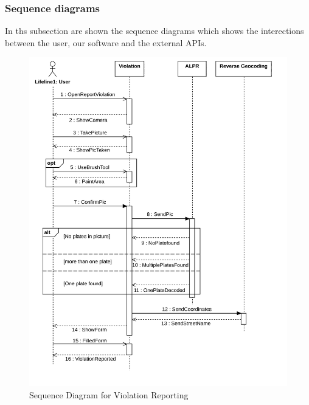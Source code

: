 

\subsubsection{Sequence diagrams}
In ths subsection are shown the sequence diagrams which shows the interections between the user, our software and the external APIs.

\begin{figure}[H]
   \centering
     \includegraphics[width=\textwidth]{Images/SequenceViolation.png}
     \caption{Sequence Diagram for Violation Reporting}   \label{fig:sequenceViolation}
\end{figure}

